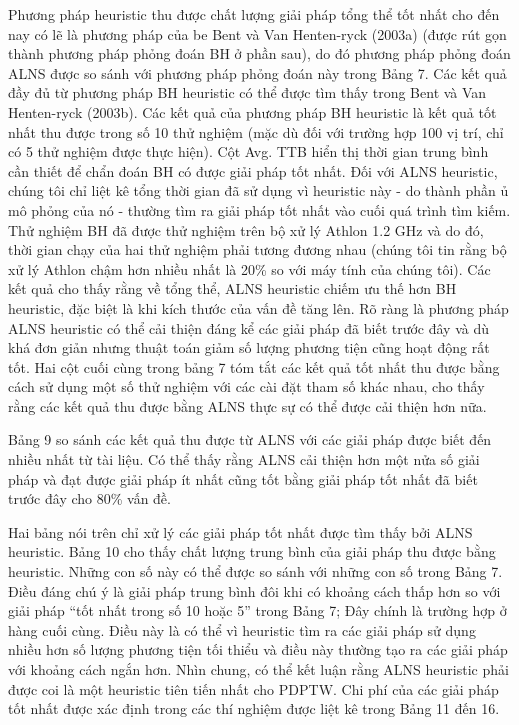 Phương pháp heuristic thu được chất lượng giải pháp tổng thể tốt nhất cho đến nay có lẽ là phương pháp của be Bent và Van Henten-ryck (2003a) (được rút gọn thành phương pháp phỏng đoán BH ở phần sau), do đó phương pháp phỏng đoán ALNS được so sánh với phương pháp phỏng đoán này trong Bảng 7. Các kết quả đầy đủ từ phương pháp BH heuristic có thể được tìm thấy trong Bent và Van Henten-ryck (2003b). Các kết quả của phương pháp BH heuristic là kết quả tốt nhất thu được trong số 10 thử nghiệm (mặc dù đối với trường hợp 100 vị trí, chỉ có 5 thử nghiệm được thực hiện). Cột Avg. TTB hiển thị thời gian trung bình cần thiết để chẩn đoán BH có được giải pháp tốt nhất. Đối với ALNS heuristic, chúng tôi chỉ liệt kê tổng thời gian đã sử dụng vì heuristic này - do thành phần ủ mô phỏng của nó - thường tìm ra giải pháp tốt nhất vào cuối quá trình tìm kiếm. Thử nghiệm BH đã được thử nghiệm trên bộ xử lý Athlon 1.2 GHz và do đó, thời gian chạy của hai thử nghiệm phải tương đương nhau (chúng tôi tin rằng bộ xử lý Athlon chậm hơn nhiều nhất là 20\% so với máy tính của chúng tôi). Các kết quả cho thấy rằng về tổng thể, ALNS heuristic chiếm ưu thế hơn BH heuristic, đặc biệt là khi kích thước của vấn đề tăng lên. Rõ ràng là phương pháp ALNS heuristic có thể cải thiện đáng kể các giải pháp đã biết trước đây và dù khá đơn giản nhưng thuật toán giảm số lượng phương tiện cũng hoạt động rất tốt. Hai cột cuối cùng trong bảng 7 tóm tắt các kết quả tốt nhất thu được bằng cách sử dụng một số thử nghiệm với các cài đặt tham số khác nhau, cho thấy rằng các kết quả thu được bằng ALNS thực sự có thể được cải thiện hơn nữa.

Bảng 9 so sánh các kết quả thu được từ ALNS với các giải pháp được biết đến nhiều nhất từ tài liệu. Có thể thấy rằng ALNS cải thiện hơn một nửa số giải pháp và đạt được giải pháp ít nhất cũng tốt bằng giải pháp tốt nhất đã biết trước đây cho 80\% vấn đề.

Hai bảng nói trên chỉ xử lý các giải pháp tốt nhất được tìm thấy bởi ALNS heuristic. Bảng 10 cho thấy chất lượng trung bình của giải pháp thu được bằng heuristic. Những con số này có thể được so sánh với những con số trong Bảng 7. Điều đáng chú ý là giải pháp trung bình đôi khi có khoảng cách thấp hơn so với giải pháp “tốt nhất trong số 10 hoặc 5” trong Bảng 7; Đây chính là trường hợp ở hàng cuối cùng. Điều này là có thể vì heuristic tìm ra các giải pháp sử dụng nhiều hơn số lượng phương tiện tối thiểu và điều này thường tạo ra các giải pháp với khoảng cách ngắn hơn.
Nhìn chung, có thể kết luận rằng ALNS heuristic phải được coi là một heuristic tiên tiến nhất cho PDPTW. Chi phí của các giải pháp tốt nhất được xác định trong các thí nghiệm được liệt kê trong Bảng 11 đến 16.

